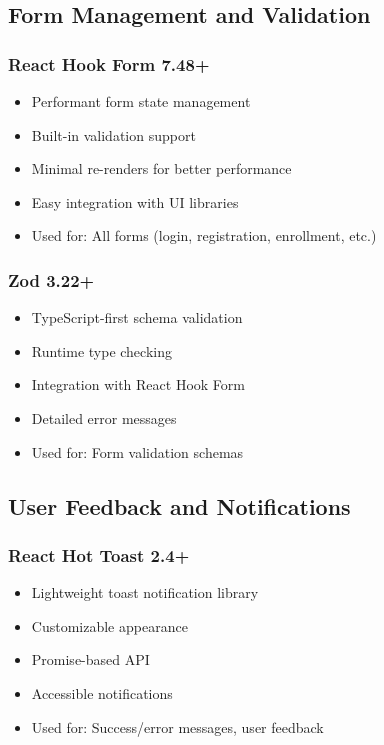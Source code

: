 \subsection{Form Management and Validation}

\subsubsection{React Hook Form 7.48+}
\begin{itemize}[leftmargin=*]
    \item Performant form state management
    \item Built-in validation support
    \item Minimal re-renders for better performance
    \item Easy integration with UI libraries
    \item Used for: All forms (login, registration, enrollment, etc.)
\end{itemize}

\subsubsection{Zod 3.22+}
\begin{itemize}[leftmargin=*]
    \item TypeScript-first schema validation
    \item Runtime type checking
    \item Integration with React Hook Form
    \item Detailed error messages
    \item Used for: Form validation schemas
\end{itemize}

\subsection{User Feedback and Notifications}

\subsubsection{React Hot Toast 2.4+}
\begin{itemize}[leftmargin=*]
    \item Lightweight toast notification library
    \item Customizable appearance
    \item Promise-based API
    \item Accessible notifications
    \item Used for: Success/error messages, user feedback
\end{itemize}


